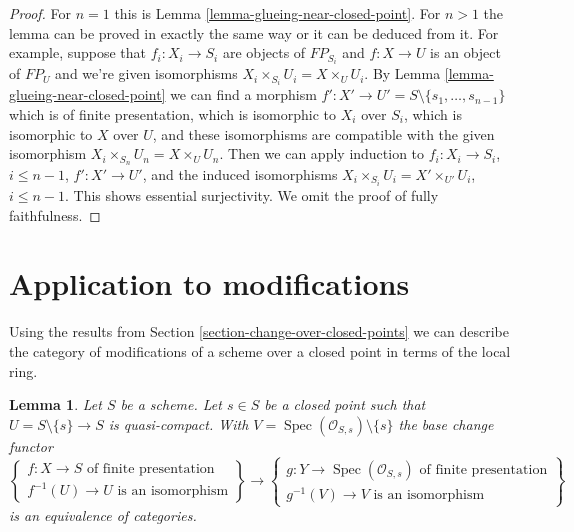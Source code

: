 \documentclass{stacks-project}
\theoremstyle{plain}
\newtheorem{lemma}[subsection]{Lemma}
\theoremstyle{definition}
\theoremstyle{remark}
\numberwithin{equation}{subsection}
\def\Spec{\mathop{\mathrm{Spec}}}
\begin{document}
\begin{proof}
For $n = 1$ this is Lemma \ref{lemma-glueing-near-closed-point}.
For $n > 1$ the lemma can be proved in exactly the same way or it
can be deduced from it. For example, suppose that $f_i : X_i \to S_i$
are objects of $FP_{S_i}$ and $f : X \to U$ is an object
of $FP_U$ and we're given isomorphisms $X_i \times_{S_i} U_i = X \times_U U_i$.
By Lemma \ref{lemma-glueing-near-closed-point} we can find
a morphism $f' : X' \to U' = S \setminus \{s_1, \ldots, s_{n - 1}\}$
which is of finite presentation, which is isomorphic to
$X_i$ over $S_i$, which is isomorphic to $X$ over $U$, and
these isomorphisms are compatible with the given isomorphism
$X_i \times_{S_n} U_n = X \times_U U_n$.
Then we can apply induction to
$f_i : X_i \to S_i$, $i \leq n - 1$,
$f' : X' \to U'$, and the induced
isomorphisms $X_i \times_{S_i} U_i = X' \times_{U'} U_i$, $i \leq n - 1$.
This shows essential surjectivity. We omit the proof of
fully faithfulness.
\end{proof}






\section{Application to modifications}
\label{section-modifications-at-a-point}

\noindent
Using the results from Section \ref{section-change-over-closed-points}
we can describe the category of modifications of
a scheme over a closed point in terms of the local ring.

\begin{lemma}
\label{lemma-modifications}
Let $S$ be a scheme. Let $s \in S$ be a closed point such that
$U = S \setminus \{s\} \to S$ is quasi-compact. With
$V = \Spec(\mathcal{O}_{S, s}) \setminus \{s\}$ the base change functor
$$
\left\{
\begin{matrix}
f : X \to S\text{ of finite presentation} \\
f^{-1}(U) \to U\text{ is an isomorphism}
\end{matrix}
\right\}
\longrightarrow
\left\{
\begin{matrix}
g : Y \to \Spec(\mathcal{O}_{S, s})\text{ of finite presentation} \\
g^{-1}(V) \to V\text{ is an isomorphism}
\end{matrix}
\right\}
$$
is an equivalence of categories.
\end{lemma}
\end{document}
